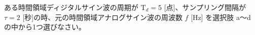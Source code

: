 ある時間領域ディジタルサイン波の周期が $\textrm{T}_d = 5$ [点]、サンプリング間隔が $\tau = 2$ [秒]の時、元の時間領域アナログサイン波の周波数 $f$ [Hz] を選択肢 a〜d の中から1つ選びなさい。
